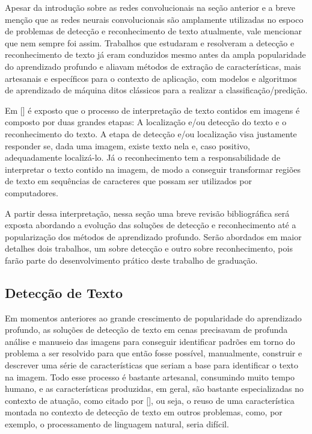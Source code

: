 Apesar da introdução sobre as redes convolucionais na seção anterior e a breve menção que as redes neurais convolucionais são amplamente utilizadas no 
espoco de problemas de detecção e reconhecimento de texto atualmente, vale mencionar que nem sempre foi assim. Trabalhos que estudaram e resolveram a 
detecção e reconhecimento de texto já eram conduzidos mesmo antes da ampla popularidade do aprendizado profundo e aliavam métodos de extração de características, 
mais artesanais e específicos para o contexto de aplicação, com modelos e algoritmos de aprendizado de máquina ditos clássicos para a realizar a classificação/predição.

Em [] é exposto que o processo de interpretação de texto contidos em imagens é composto por duas grandes etapas: A 
localização e/ou detecção do texto e o reconhecimento do texto. A etapa de detecção e/ou localização visa justamente responder se, dada uma imagem, 
existe texto nela e, caso positivo, adequadamente localizá-lo. Já o reconhecimento tem a responsabilidade de interpretar o texto contido na imagem, de 
modo a conseguir transformar regiões de texto em sequências de caracteres que possam ser utilizados por computadores.

A partir dessa interpretação, nessa seção uma breve revisão bibliográfica será exposta abordando a evolução das soluções de detecção e reconhecimento 
até a popularização dos métodos de aprendizado profundo. Serão abordados em maior detalhes dois trabalhos, um sobre detecção e outro sobre reconhecimento, 
pois farão parte do desenvolvimento prático deste trabalho de graduação.


\subsection{Detecção de Texto}
Em momentos anteriores ao grande crescimento de popularidade do aprendizado profundo, as soluções de detecção de texto em cenas precisavam de profunda 
análise e manuseio das imagens para conseguir identificar padrões em torno do problema a ser resolvido para que então fosse possível, manualmente, construir 
e descrever uma série de características que seriam a base para identificar o texto na imagem. Todo esse processo é bastante artesanal, consumindo muito 
tempo humano, e as características produzidas, em geral, são bastante especializadas no contexto de atuação, como citado por [], 
ou seja, o reuso de uma característica montada no contexto de detecção de texto em outros problemas, como, por exemplo, o processamento de linguagem natural, 
seria difícil.

